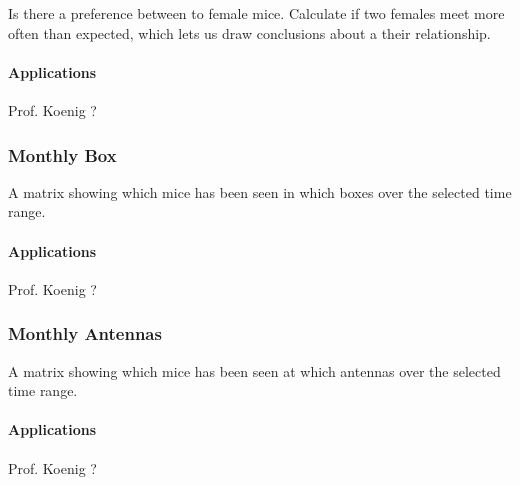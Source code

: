 Is there a preference between to female mice.
Calculate if two females meet more often than expected, which lets us draw conclusions about a their relationship.

\paragraph{Applications}
Prof. Koenig ?

\subsubsection{Monthly Box}
\label{subsubsec:monthbox}

A matrix  showing which mice has been seen in which boxes over the selected time range.

\paragraph{Applications}
Prof. Koenig ?

\subsubsection{Monthly Antennas}
\label{subsubsec:monthant}

A matrix  showing which mice has been seen at which antennas over the selected time range.

\paragraph{Applications}
Prof. Koenig ?
